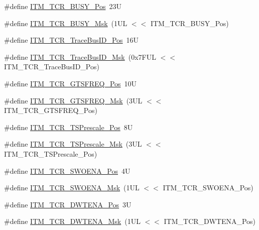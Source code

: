 \begin{DoxyCompactItemize}
\item 
\#define \hyperlink{group___c_m_s_i_s___i_t_m_ga9174ad4a36052c377cef4e6aba2ed484}{I\+T\+M\+\_\+\+T\+C\+R\+\_\+\+B\+U\+S\+Y\+\_\+\+Pos}~23U
\item 
\#define \hyperlink{group___c_m_s_i_s___i_t_m_ga43ad7cf33de12f2ef3a412d4f354c60f}{I\+T\+M\+\_\+\+T\+C\+R\+\_\+\+B\+U\+S\+Y\+\_\+\+Msk}~(1\+U\+L $<$$<$ I\+T\+M\+\_\+\+T\+C\+R\+\_\+\+B\+U\+S\+Y\+\_\+\+Pos)
\item 
\#define \hyperlink{group___c_m_s_i_s___i_t_m_gaca0281de867f33114aac0636f7ce65d3}{I\+T\+M\+\_\+\+T\+C\+R\+\_\+\+Trace\+Bus\+I\+D\+\_\+\+Pos}~16U
\item 
\#define \hyperlink{group___c_m_s_i_s___i_t_m_ga60c20bd9649d1da5a2be8e656ba19a60}{I\+T\+M\+\_\+\+T\+C\+R\+\_\+\+Trace\+Bus\+I\+D\+\_\+\+Msk}~(0x7\+F\+U\+L $<$$<$ I\+T\+M\+\_\+\+T\+C\+R\+\_\+\+Trace\+Bus\+I\+D\+\_\+\+Pos)
\item 
\#define \hyperlink{group___c_m_s_i_s___i_t_m_ga96c7c7cbc0d98426c408090b41f583f1}{I\+T\+M\+\_\+\+T\+C\+R\+\_\+\+G\+T\+S\+F\+R\+E\+Q\+\_\+\+Pos}~10U
\item 
\#define \hyperlink{group___c_m_s_i_s___i_t_m_gade862cf009827f7f6748fc44c541b067}{I\+T\+M\+\_\+\+T\+C\+R\+\_\+\+G\+T\+S\+F\+R\+E\+Q\+\_\+\+Msk}~(3\+U\+L $<$$<$ I\+T\+M\+\_\+\+T\+C\+R\+\_\+\+G\+T\+S\+F\+R\+E\+Q\+\_\+\+Pos)
\item 
\#define \hyperlink{group___c_m_s_i_s___i_t_m_gad7bc9ee1732032c6e0de035f0978e473}{I\+T\+M\+\_\+\+T\+C\+R\+\_\+\+T\+S\+Prescale\+\_\+\+Pos}~8U
\item 
\#define \hyperlink{group___c_m_s_i_s___i_t_m_ga7a723f71bfb0204c264d8dbe8cc7ae52}{I\+T\+M\+\_\+\+T\+C\+R\+\_\+\+T\+S\+Prescale\+\_\+\+Msk}~(3\+U\+L $<$$<$ I\+T\+M\+\_\+\+T\+C\+R\+\_\+\+T\+S\+Prescale\+\_\+\+Pos)
\item 
\#define \hyperlink{group___c_m_s_i_s___i_t_m_ga7a380f0c8078f6560051406583ecd6a5}{I\+T\+M\+\_\+\+T\+C\+R\+\_\+\+S\+W\+O\+E\+N\+A\+\_\+\+Pos}~4U
\item 
\#define \hyperlink{group___c_m_s_i_s___i_t_m_ga97476cb65bab16a328b35f81fd02010a}{I\+T\+M\+\_\+\+T\+C\+R\+\_\+\+S\+W\+O\+E\+N\+A\+\_\+\+Msk}~(1\+U\+L $<$$<$ I\+T\+M\+\_\+\+T\+C\+R\+\_\+\+S\+W\+O\+E\+N\+A\+\_\+\+Pos)
\item 
\#define \hyperlink{group___c_m_s_i_s___i_t_m_ga30e83ebb33aa766070fe3d1f27ae820e}{I\+T\+M\+\_\+\+T\+C\+R\+\_\+\+D\+W\+T\+E\+N\+A\+\_\+\+Pos}~3U
\item 
\#define \hyperlink{group___c_m_s_i_s___i_t_m_ga98ea1c596d43d3633a202f9ee746cf70}{I\+T\+M\+\_\+\+T\+C\+R\+\_\+\+D\+W\+T\+E\+N\+A\+\_\+\+Msk}~(1\+U\+L $<$$<$ I\+T\+M\+\_\+\+T\+C\+R\+\_\+\+D\+W\+T\+E\+N\+A\+\_\+\+Pos)

\end{DoxyCompactItemize}
